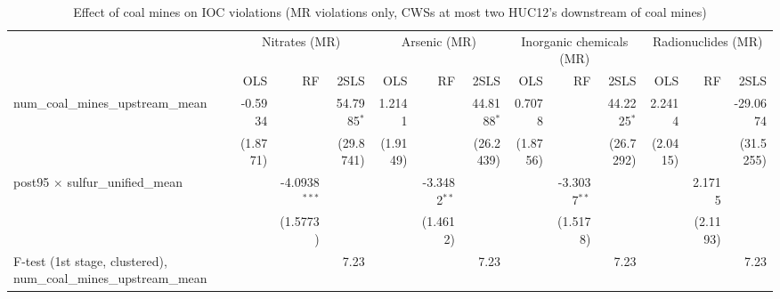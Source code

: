 
\begin{table}[htbp]
   
   \caption{\label{2sls_dwnstrm2step_minevio_mr} Effect of coal mines on IOC violations (MR violations only, CWSs at most two HUC12's downstream of coal mines)}
   \bigskip
   
   \centering
   
   \begin{adjustbox}{width = \textwidth, center}
      
      
      \begin{tabular}{lrrrrrrrrrrrr}
         \toprule
         
          & \multicolumn{3}{c}{Nitrates (MR)} & \multicolumn{3}{c}{Arsenic (MR)} & \multicolumn{3}{c}{Inorganic chemicals (MR)} & \multicolumn{3}{c}{Radionuclides (MR)}\\
         
                                                                             & OLS      & RF              & 2SLS          & OLS      & RF             & 2SLS          & OLS      & RF             & 2SLS          & OLS      & RF       & 2SLS\\  
         
         \midrule 
         num\_coal\_mines\_upstream\_mean                                    & -0.5934  &                 & 54.7985$^{*}$ & 1.2141   &                & 44.8188$^{*}$ & 0.7078   &                & 44.2225$^{*}$ & 2.2414   &          & -29.0674\\   
                                                                             & (1.8771) &                 & (29.8741)     & (1.9149) &                & (26.2439)     & (1.8756) &                & (26.7292)     & (2.0415) &          & (31.5255)\\   
         post95 $\times$ sulfur\_unified\_mean                               &          & -4.0938$^{***}$ &               &          & -3.3482$^{**}$ &               &          & -3.3037$^{**}$ &               &          & 2.1715   &   \\   
                                                                             &          & (1.5773)        &               &          & (1.4612)       &               &          & (1.5178)       &               &          & (2.1193) &   \\   
         
         F-test (1st stage, clustered), num\_coal\_mines\_upstream\_mean     &          &                 & 7.23          &          &                & 7.23          &          &                & 7.23          &          &          & 7.23\\  
         

\end{tabular}
\end{adjustbox}
\end{table}
